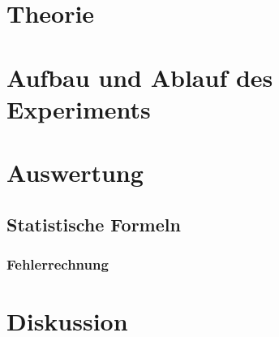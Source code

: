 \documentclass[a4,11pt]{article}
\newcommand{\V}{V605}
\begin{document}



\tableofcontents
\clearpage


\section{Theorie}

\clearpage


\section{Aufbau und Ablauf des Experiments}
\label{sec:aufbau}

\clearpage


\section{Auswertung}
\subsection{Statistische Formeln}
\subsubsection{Fehlerrechnung}
\label{sec:Fehlerrechnung}

%

\clearpage


\section{Diskussion}


\clearpage
\listoftodos
\listoffigures
\listoftables
\clearpage
\nocite{\V}
\printbibliography[title = Literaturverzeichnis]
\end{document}
